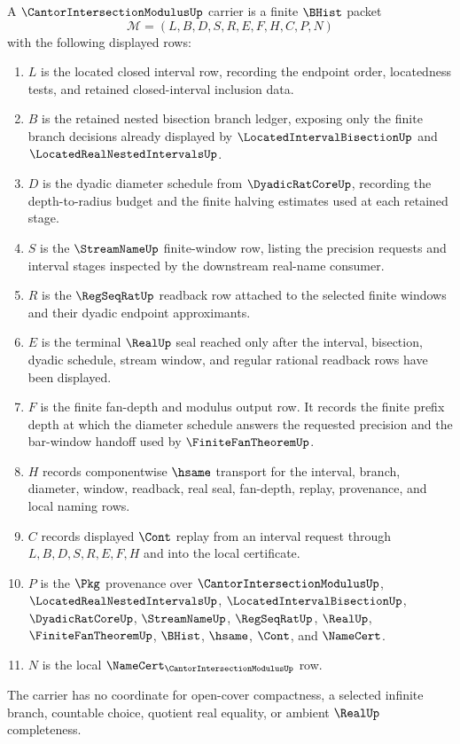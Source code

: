 \begin{definition}
\label{def:cantor-intersection-modulus-carrier}
A $\CantorIntersectionModulusUp$ carrier is a finite $\BHist$ packet
$$
\mathcal{M}=(L,B,D,S,R,E,F,H,C,P,N)
$$
with the following displayed rows:
\begin{enumerate}
\item $L$ is the located closed interval row, recording the endpoint order, locatedness tests, and retained closed-interval inclusion data.
\item $B$ is the retained nested bisection branch ledger, exposing only the finite branch decisions already displayed by $\LocatedIntervalBisectionUp$ and $\LocatedRealNestedIntervalsUp$.
\item $D$ is the dyadic diameter schedule from $\DyadicRatCoreUp$, recording the depth-to-radius budget and the finite halving estimates used at each retained stage.
\item $S$ is the $\StreamNameUp$ finite-window row, listing the precision requests and interval stages inspected by the downstream real-name consumer.
\item $R$ is the $\RegSeqRatUp$ readback row attached to the selected finite windows and their dyadic endpoint approximants.
\item $E$ is the terminal $\RealUp$ seal reached only after the interval, bisection, dyadic schedule, stream window, and regular rational readback rows have been displayed.
\item $F$ is the finite fan-depth and modulus output row. It records the finite prefix depth at which the diameter schedule answers the requested precision and the bar-window handoff used by $\FiniteFanTheoremUp$.
\item $H$ records componentwise $\hsame$ transport for the interval, branch, diameter, window, readback, real seal, fan-depth, replay, provenance, and local naming rows.
\item $C$ records displayed $\Cont$ replay from an interval request through $L,B,D,S,R,E,F,H$ and into the local certificate.
\item $P$ is the $\Pkg$ provenance over $\CantorIntersectionModulusUp$, $\LocatedRealNestedIntervalsUp$, $\LocatedIntervalBisectionUp$, $\DyadicRatCoreUp$, $\StreamNameUp$, $\RegSeqRatUp$, $\RealUp$, $\FiniteFanTheoremUp$, $\BHist$, $\hsame$, $\Cont$, and $\NameCert$.
\item $N$ is the local $\NameCert_{\CantorIntersectionModulusUp}$ row.
\end{enumerate}
The carrier has no coordinate for open-cover compactness, a selected infinite branch, countable choice, quotient real equality, or ambient $\RealUp$ completeness.
\end{definition}

